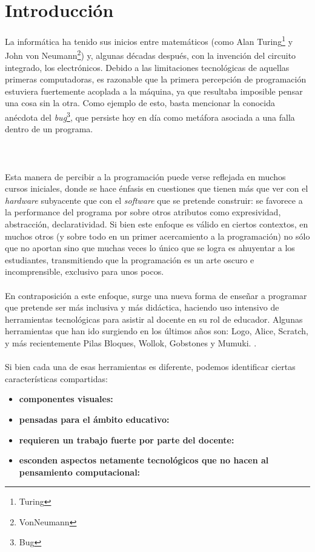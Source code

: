 \newcommand{\caracteristica}[1]{\item \textbf{#1:}}

\section{Introducción}
La informática ha tenido sus inicios entre matemáticos (como Alan Turing\footnote{Turing} y John von Neumann\footnote{VonNeumann}) y, algunas décadas después, con la invención del circuito integrado, los electrónicos. Debido a las limitaciones tecnológicas de aquellas primeras computadoras, es razonable que la primera percepción de programación estuviera fuertemente acoplada a la máquina, ya que resultaba imposible pensar una cosa sin la otra. Como ejemplo de esto, basta mencionar la conocida anécdota del \textit{bug}\footnote{Bug}, que persiste hoy en día como metáfora asociada a una falla dentro de un programa.
\\\\
\\\\
Esta manera de percibir a la programación puede verse reflejada en muchos cursos iniciales, donde se hace énfasis en cuestiones que tienen más que ver con el \textit{hardware} subyacente que con el \textit{software} que se pretende construir: se favorece a la performance del programa por sobre otros atributos como expresividad, abstracción, declaratividad. Si bien este enfoque es válido en ciertos contextos, en muchos otros (y sobre todo en un primer acercamiento a la programación) no sólo que no aportan sino que muchas veces lo único que se logra es ahuyentar a los estudiantes, transmitiendo que la programación es un arte oscuro e incomprensible, exclusivo para unos pocos.
\\\\
En contraposición a este enfoque, surge una nueva forma de enseñar a programar que pretende ser más inclusiva y más didáctica, haciendo uso intensivo de herramientas tecnológicas para asistir al docente en su rol de educador. Algunas herramientas que han ido surgiendo en los últimos años son: Logo, Alice, Scratch, y más recientemente Pilas Bloques, Wollok, Gobstones y Mumuki. .
\\\\
Si bien cada una de esas herramientas es diferente, podemos identificar ciertas características compartidas:
\begin{itemize}
  \caracteristica{componentes visuales}
  \caracteristica{pensadas para el ámbito educativo}
  \caracteristica{requieren un trabajo fuerte por parte del docente}
  \caracteristica{esconden aspectos netamente tecnológicos que no hacen al pensamiento computacional}  
\end{itemize}

